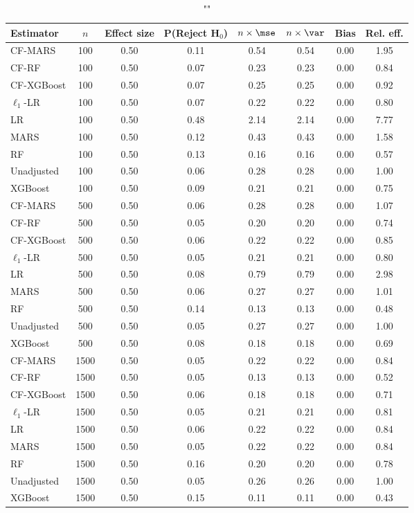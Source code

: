 \begin{table}
\centering
\caption{""}
\begin{tabular}{lccccccc}
\toprule
Estimator & $n$ & Effect size & P(Reject H$_0$) & $n\times\mse$ & $n\times \var$ & Bias & Rel. eff.\\ \midrule
CF-MARS & 100 & 0.50 & 0.11 & 0.54 & 0.54 & 0.00 & 1.95 \\ 
CF-RF & 100 & 0.50 & 0.07 & 0.23 & 0.23 & 0.00 & 0.84 \\ 
CF-XGBoost & 100 & 0.50 & 0.07 & 0.25 & 0.25 & 0.00 & 0.92 \\ 
$\ell_1$-LR & 100 & 0.50 & 0.07 & 0.22 & 0.22 & 0.00 & 0.80 \\ 
LR & 100 & 0.50 & 0.48 & 2.14 & 2.14 & 0.00 & 7.77 \\ 
MARS & 100 & 0.50 & 0.12 & 0.43 & 0.43 & 0.00 & 1.58 \\ 
RF & 100 & 0.50 & 0.13 & 0.16 & 0.16 & 0.00 & 0.57 \\ 
Unadjusted & 100 & 0.50 & 0.06 & 0.28 & 0.28 & 0.00 & 1.00 \\ 
XGBoost & 100 & 0.50 & 0.09 & 0.21 & 0.21 & 0.00 & 0.75 \\ \addlinespace 
CF-MARS & 500 & 0.50 & 0.06 & 0.28 & 0.28 & 0.00 & 1.07 \\ 
CF-RF & 500 & 0.50 & 0.05 & 0.20 & 0.20 & 0.00 & 0.74 \\ 
CF-XGBoost & 500 & 0.50 & 0.06 & 0.22 & 0.22 & 0.00 & 0.85 \\ 
$\ell_1$-LR & 500 & 0.50 & 0.05 & 0.21 & 0.21 & 0.00 & 0.80 \\ 
LR & 500 & 0.50 & 0.08 & 0.79 & 0.79 & 0.00 & 2.98 \\ 
MARS & 500 & 0.50 & 0.06 & 0.27 & 0.27 & 0.00 & 1.01 \\ 
RF & 500 & 0.50 & 0.14 & 0.13 & 0.13 & 0.00 & 0.48 \\ 
Unadjusted & 500 & 0.50 & 0.05 & 0.27 & 0.27 & 0.00 & 1.00 \\ 
XGBoost & 500 & 0.50 & 0.08 & 0.18 & 0.18 & 0.00 & 0.69 \\ \addlinespace 
CF-MARS & 1500 & 0.50 & 0.05 & 0.22 & 0.22 & 0.00 & 0.84 \\ 
CF-RF & 1500 & 0.50 & 0.05 & 0.13 & 0.13 & 0.00 & 0.52 \\ 
CF-XGBoost & 1500 & 0.50 & 0.06 & 0.18 & 0.18 & 0.00 & 0.71 \\ 
$\ell_1$-LR & 1500 & 0.50 & 0.05 & 0.21 & 0.21 & 0.00 & 0.81 \\ 
LR & 1500 & 0.50 & 0.06 & 0.22 & 0.22 & 0.00 & 0.84 \\ 
MARS & 1500 & 0.50 & 0.05 & 0.22 & 0.22 & 0.00 & 0.84 \\ 
RF & 1500 & 0.50 & 0.16 & 0.20 & 0.20 & 0.00 & 0.78 \\ 
Unadjusted & 1500 & 0.50 & 0.05 & 0.26 & 0.26 & 0.00 & 1.00 \\ 
XGBoost & 1500 & 0.50 & 0.15 & 0.11 & 0.11 & 0.00 & 0.43 \\
\bottomrule
\end{tabular}
\end{table}

